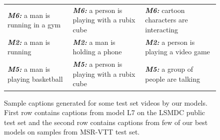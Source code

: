 \begin{figure}[thp]
\begin{center}
\begin{adjustbox}{center}
\begin{tabular}{lll}
    \textbf{\scriptsize\em M6:} \scriptsize a man is running in a gym &
    \textbf{\scriptsize\em M6:} \scriptsize a person is playing with a rubix cube &
    \textbf{\scriptsize\em M6:} \scriptsize cartoon characters are interacting\\
    \textbf{\scriptsize\em M2:} \scriptsize a man is running&
    \textbf{\scriptsize\em M2:} \scriptsize a man is holding a phone&
    \textbf{\scriptsize\em M2:} \scriptsize a person is playing a video game\\
    \textbf{\scriptsize\em M5:} \scriptsize a man is playing basketball&
    \textbf{\scriptsize\em M5:} \scriptsize a person is playing with a rubix cube &
    \textbf{\scriptsize\em M5:} \scriptsize a group of people are talking\\
  \end{tabular}
  \end{adjustbox}
  \end{center}
  \vspace{-5mm}
  \caption{Sample captions generated for some test set videos by our models.
  First row contains captions from model L7 on the LSMDC public test set and the
  second row contains captions from few of our best models on samples from
  MSR-VTT test set.}
  \label{fig:VttcapSamps}
\end{figure}

